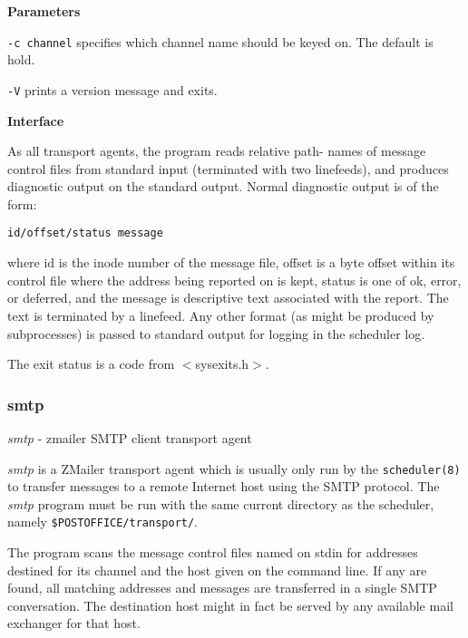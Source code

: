{\bf Parameters}

{\tt -c channel} specifies which channel name should be keyed on. The default is hold.

{\tt -V} prints a version message and exits.

{\bf Interface}

As all transport agents, the program reads relative path-
names of message control files from standard input (terminated 
with two linefeeds), and produces diagnostic output
on the standard output. Normal diagnostic output is of
the form:

\begin{tscreen}
\begin{verbatim}
id/offset/status message
\end{verbatim}
\end{tscreen}


where id is the inode number of the message file, offset
is a byte offset within its control file where the address
being reported on is kept, status is one of ok, error, or
deferred, and the message is descriptive text associated
with the report. The text is terminated by a linefeed.
Any other format (as might be produced by subprocesses) is
passed to standard output for logging in the scheduler
log.

The exit status is a code from {\(<\)}sysexits.h{\(>\)}.








\subsubsection{smtp}



{\em smtp\/} - zmailer SMTP client transport agent

{\em smtp\/} is a ZMailer transport agent which is usually only
run by the {\tt scheduler(8)} to transfer messages to a remote
Internet host using the SMTP protocol. The {\em smtp\/} program
must be run with the same current directory as the scheduler, 
namely {\tt \$POSTOFFICE/transport/}.

The program scans the message control files named on stdin
for addresses destined for its channel and the host given
on the command line. If any are found, all matching
addresses and messages are transferred in a single SMTP
conversation. The destination host might in fact be
served by any available mail exchanger for that host.

